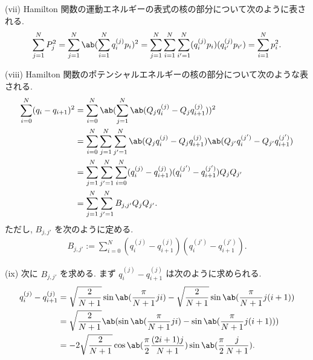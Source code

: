 \documentclass[uplatex,diffipdfmx,a4paper,11pt]{jlreq}
\theoremstyle{definition}
\begin{document}
(vii) Hamilton 関数の運動エネルギーの表式の核の部分について次のように表される.
\begin{align}
  \sum_{j=1}^{N}P_j^2 = \sum_{j=1}^{N}\ab(\sum_{i=1}^{N}q_i^{(j)}p_i)^2 = \sum_{j=1}^{N}\sum_{i=1}^{N}\sum_{i'=1}^{N}(q_i^{(j)}p_i)(q_{i'}^{(j)}p_{i'}) = \sum_{i=1}^{N}p_i^2.
\end{align}

(viii) Hamilton 関数のポテンシャルエネルギーの核の部分について次のような表される.
\begin{align}
  \sum_{i=0}^{N}(q_i - q_{i+1})^2 & = \sum_{i=0}^{N}\ab(\sum_{j=1}^{N}\ab(Q_jq_i^{(j)} - Q_jq_{i+1}^{(j)}))^2                                                     \\
                                  & = \sum_{i=0}^{N}\sum_{j=1}^{N}\sum_{j'=1}^{N}\ab(Q_jq_i^{(j)} - Q_jq_{i+1}^{(j)})\ab(Q_{j'}q_i^{(j')} - Q_{j'}q_{i+1}^{(j')}) \\
                                  & = \sum_{j=1}^{N}\sum_{j'=1}^{N}\sum_{i=0}^{N}(q_i^{(j)} - q_{i+1}^{(j)})(q_i^{(j')} - q_{i+1}^{(j')})Q_jQ_{j'}                \\
                                  & = \sum_{j=1}^{N}\sum_{j'=1}^{N}B_{j,j'}Q_jQ_{j'}.
\end{align}
ただし, $B_{j,j'}$ を次のように定める.
\begin{align}
  B_{j,j'} := \sum_{i=0}^{N}(q_i^{(j)} - q_{i+1}^{(j)})(q_i^{(j')} - q_{i+1}^{(j')}).
\end{align}

(ix) 次に $B_{j,j'}$ を求める. まず $q_i^{(j)} - q_{i+1}^{(j)}$ は次のように求められる.
\begin{align}
  q_i^{(j)} - q_{i+1}^{(j)} & = \sqrt{\frac{2}{N+1}}\sin\ab(\frac{\pi}{N+1}ji) - \sqrt{\frac{2}{N+1}}\sin\ab(\frac{\pi}{N+1}j(i+1)) \\
                            & = \sqrt{\frac{2}{N+1}}\ab(\sin\ab(\frac{\pi}{N+1}ji) - \sin\ab(\frac{\pi}{N+1}j(i+1)))                \\
                            & = -2\sqrt{\frac{2}{N+1}}\cos\ab(\frac{\pi}{2}\frac{(2i+1)j}{N+1})\sin\ab(\frac{\pi}{2}\frac{j}{N+1}).
\end{align}
\end{document}
